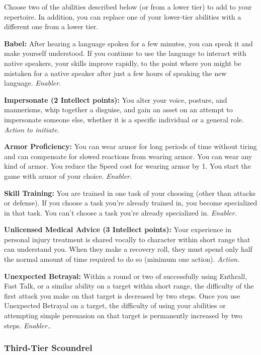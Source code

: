 \documentclass[a4paper,10pt,final,twocolumn,oneside]{book}
\newcommand{\itemAbility}[2]{\textcolor{25gray}{\textbullet\textbf{ #1:}}{ #2}\par}
\newcommand{\enabler}{\textit{ Enabler.}}
\newcommand{\action}{\textit{ Action.}}
\newcommand{\actionInit}{\textit{ Action to initiate.}}
\begin{document}
Choose two of the abilities described below (or from a lower tier) to add to your repertoire. In addition, you can replace one of your lower-tier abilities with a different one from a lower tier.

\itemAbility{Babel}{After hearing a language spoken for a few minutes, you can speak it and make yourself understood. If you continue to use the language to interact with native speakers, your skills improve rapidly, to the point where you might be mistaken for a native speaker after just a few hours of speaking the new language.\enabler}

\itemAbility{Impersonate (2 Intellect points)}{You alter your voice, posture, and mannerisms, whip together a disguise, and gain an asset on an attempt to impersonate someone else, whether it is a specific individual or a general role.\actionInit}

\itemAbility{Armor Proficiency}{You can wear armor for long periods of time without tiring and can compensate for slowed reactions from wearing armor. You can wear any kind of armor. You reduce the Speed cost for wearing armor by 1. You start the game with armor of your choice.\enabler}

\itemAbility{Skill Training}{You are trained in one task of your choosing (other than attacks or defense). If you choose a task you’re already trained in, you become specialized in that task. You can’t choose a task you’re already specialized in.\enabler}

\itemAbility{Unlicensed Medical Advice (3 Intellect points)}{Your experience in personal injury treatment is shared vocally to character within short range that can understand you. When they make a recovery roll, they must spend only half the normal amount of time required to do so (minimum one action).\action}

\itemAbility{Unexpected Betrayal}{Within a round or two of successfully using Enthrall, Fast Talk, or a similar ability on a target within short range, the difficulty of the first attack you make on that target is decreased by two steps. Once you use Unexpected Betrayal on a target, the difficulty of using your abilities or attempting simple persuasion on that target is permanently increased by two steps.\enabler.}


\subsubsection*{Third-Tier Scoundrel}
\label{subsub:scoundrelThirdTier}
\end{document}
